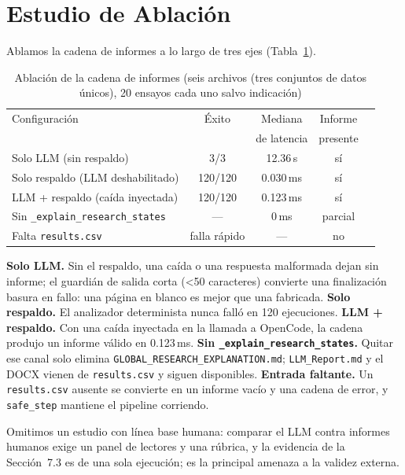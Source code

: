 \documentclass[10pt,twocolumn,letterpaper]{article}
\begin{document}
\section{Estudio de Ablación}
Ablamos la cadena de informes a lo largo de tres ejes (Tabla~\ref{tab:ablation}).

\begin{table}[htbp]
\centering
\caption{Ablación de la cadena de informes (seis archivos (tres conjuntos de datos únicos), 20 ensayos cada uno salvo indicación)}
\label{tab:ablation}
\begin{tabular}{@{}lcccc@{}}
\toprule
Configuración & Éxito & Mediana & Informe \\
 & & de latencia & presente \\
\midrule
Solo LLM (sin respaldo) & 3/3 & 12.36\,s & sí \\
Solo respaldo (LLM deshabilitado) & 120/120 & 0.030\,ms & sí \\
LLM + respaldo (caída inyectada) & 120/120 & 0.123\,ms & sí \\
Sin \texttt{\_explain\_research\_states} & --- & 0\,ms & parcial \\
Falta \texttt{results.csv} & falla rápido & --- & no \\
\bottomrule
\end{tabular}
\end{table}

\textbf{Solo LLM.} Sin el respaldo, una caída o una respuesta malformada dejan sin informe; el guardián de salida corta (\textless{}50 caracteres) convierte una finalización basura en fallo: una página en blanco es mejor que una fabricada. \textbf{Solo respaldo.} El analizador determinista nunca falló en 120 ejecuciones. \textbf{LLM + respaldo.} Con una caída inyectada en la llamada a OpenCode, la cadena produjo un informe válido en 0.123\,ms. \textbf{Sin \texttt{\_explain\_research\_states}.} Quitar ese canal solo elimina \texttt{GLOBAL\_RESEARCH\_EXPLANATION.md}; \texttt{LLM\_Report.md} y el DOCX vienen de \texttt{results.csv} y siguen disponibles. \textbf{Entrada faltante.} Un \texttt{results.csv} ausente se convierte en un informe vacío y una cadena de error, y \texttt{safe\_step} mantiene el pipeline corriendo.

Omitimos un estudio con línea base humana: comparar el LLM contra informes humanos exige un panel de lectores y una rúbrica, y la evidencia de la Sección~7.3 es de una sola ejecución; es la principal amenaza a la validez externa.
\end{document}
